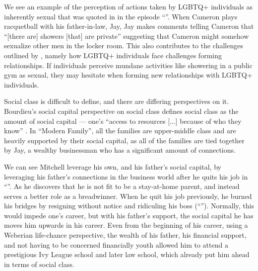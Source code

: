 \documentclass[12pt, letterpaper]{article}
\begin{document}
We see an example of the perception of actions taken by LGBTQ+ individuals as inherently sexual that was quoted in \autocite{sexuality_lecture} in the episode ``''. When Cameron plays racquetball with his father-in-law, Jay, Jay makes comments telling Cameron that ``[there are] showers [that] are private'' suggesting that Cameron might somehow sexualize other men in the locker room. This also contributes to the challenges outlined by \autocite{sexuality_lecture}, namely how LGBTQ+ individuals face challenges forming relationships. If individuals perceive mundane activities like showering in a public gym as sexual, they may hesitate when forming new relationships with LGBTQ+ individuals.

Social class is difficult to define, and there are differing perspectives on it. Bourdieu's social capital perspective on social class defines social class as the amount of social capital --- one's ``access to resources [...] because of who they know'' \autocite{social_class_lecture}. In ``Modern Family'', all the families are upper-middle class and are heavily supported by their social capital, as all of the families are tied together by Jay, a wealthy businessman who has a significant amount of connections.

We can see Mitchell leverage his own, and his father's social capital, by leveraging his father's connections in the business world after he quits his job in ``''. As he discovers that he is not fit to be a stay-at-home parent, and instead serves a better role as a breadwinner. When he quit his job previously, he burned his bridges by resigning without notice and ridiculing his boss (``''). Normally, this would impede one's career, but with his father's support, the social capital he has moves him upwards in his career. Even from the beginning of his career, using a Weberian life-chance perspective, the wealth of his father, his financial support, and not having to be concerned financially youth allowed him to attend a prestigious Ivy League school and later law school, which already put him ahead in terms of social class.
\end{document}
